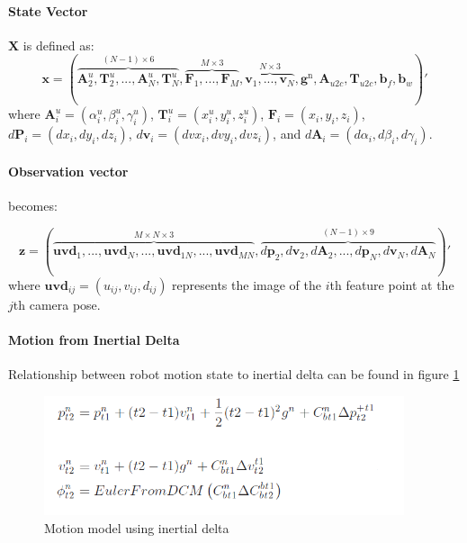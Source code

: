 \documentclass[12pt]{article}   %
\begin{document}
\paragraph{State Vector} $\textbf{X}$ is defined as:
$$\textbf{x} = (\overbrace{\textbf{A}^u_2, \textbf{T}^u_{2}, ... , \textbf{A}^u_{N}, \textbf{T}^u_{N}}^{(N - 1) \times 6}, \overbrace{\textbf{F}_{1}, ..., \textbf{F}_{M}}^{M \times 3}, \overbrace{\textbf{v}_1, ..., \textbf{v}_{N}}^{N \times 3},  \textbf{g}^{\mathrm{n}}, \textbf{A}_{u2c}, \textbf{T}_{u2c}, \textbf{b}_f, \textbf{b}_w)' $$
where
$\textbf{A}^u_i = (\alpha^u_i, \beta^u_i, \gamma^u_i)$,
$\textbf{T}^u_i = (x^u_i, y^u_i, z^u_i) $,
$\textbf{F}_{i} = (x_{i}, y_{i}, z_{i}) $,
$d\textbf{P}_{i} = (dx_{i}, dy_{i}, dz_{i}) $,
$d\textbf{v}_{i} = (dvx_{i}, dvy_{i}, dvz_{i}) $, and
$d\textbf{A}_{i} = (d\alpha_{i}, d\beta_{i}, d\gamma_{i}) $.

\paragraph{Observation vector} becomes:

$$\textbf{z} = (\overbrace{\textbf{uvd}_{1}, ... , \textbf{uvd}_{N}, ..., \textbf{uvd}_{1N}, ... , \textbf{uvd}_{MN}}^{M \times N \times 3}, \overbrace{d\textbf{p}_2, d\textbf{v}_2, d\textbf{A}_2, ..., d\textbf{p}_N, d\textbf{v}_N, d\textbf{A}_N}^{(N - 1) \times 9})' $$
where $\textbf{uvd}_{ij} = (u_{ij}, v_{ij}, d_{ij})$ represents the image of the $i$th feature point  at the $j$th camera pose.

\paragraph{Motion from Inertial Delta}
Relationship between robot motion state to inertial delta can be found in figure \ref{fig:motionModel_idt}
\begin{figure}[h!]
	\label{fig:preint}
	\includegraphics[height=3.5cm]{figures/motion_model_with_preint.png}
	\caption{Motion model using inertial delta}
	\label{fig:motionModel_idt}
\end{figure}
\end{document}

